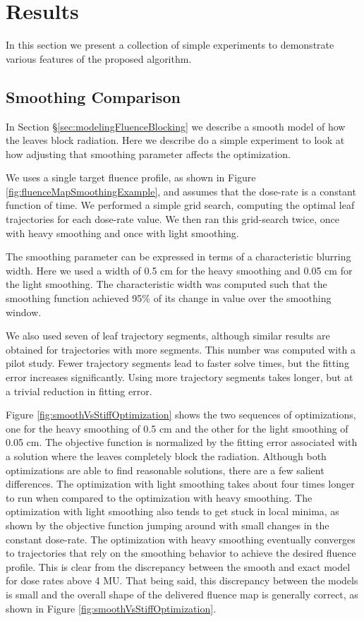 \section{Results}

In this section we present a collection of simple experiments to demonstrate various features of the
proposed algorithm.


\subsection{Smoothing Comparison}
\label{sec:LeafSmoothingComparison}

In Section \S\ref{sec:modelingFluenceBlocking} we describe a smooth model of how the leaves block radiation.
Here we describe do a simple experiment to look at how adjusting that smoothing parameter affects the optimization.

We uses a single target fluence profile, as shown in Figure \ref{fig:fluenceMapSmoothingExample},
and assumes that the dose-rate is a constant function of time.
We performed a simple grid search, computing the optimal leaf trajectories for each dose-rate value.
We then ran this grid-search twice, once with heavy smoothing and once with light smoothing.

The smoothing parameter can be expressed in terms of a characteristic blurring width.
Here we used a width of 0.5 cm for the heavy smoothing and 0.05 cm for the light smoothing.
The characteristic width was computed such that the smoothing function achieved 95\% of its
change in value over the smoothing window.

We also used seven of leaf trajectory segments, although similar results are obtained for trajectories with more segments.
This number was computed with a pilot study.
Fewer trajectory segments lead to faster solve times, but the fitting error increases significantly.
Using more trajectory segments takes longer, but at a trivial reduction in fitting error.

Figure \ref{fig:smoothVsStiffOptimization} shows the two sequences of optimizations, one for the
heavy smoothing of 0.5 cm and the other for the light smoothing of 0.05 cm.
The objective function is normalized by the fitting error associated with a solution where the
leaves completely block the radiation.
Although both optimizations are able to find reasonable solutions, there are a few salient differences.
The optimization with light smoothing takes about four times longer to run when
compared to the optimization with heavy smoothing.
The optimization with light smoothing also tends to get stuck in local minima, as shown by the
objective function jumping around with small changes in the constant dose-rate.
The optimization with heavy smoothing eventually converges to trajectories that rely on the
smoothing behavior to achieve the desired fluence profile. This is clear from the discrepancy
between the smooth and exact model for dose rates above 4 MU.
That being said, this discrepancy between the models is small and the overall shape of the delivered
fluence map is generally correct, as shown in Figure \ref{fig:smoothVsStiffOptimization}.

